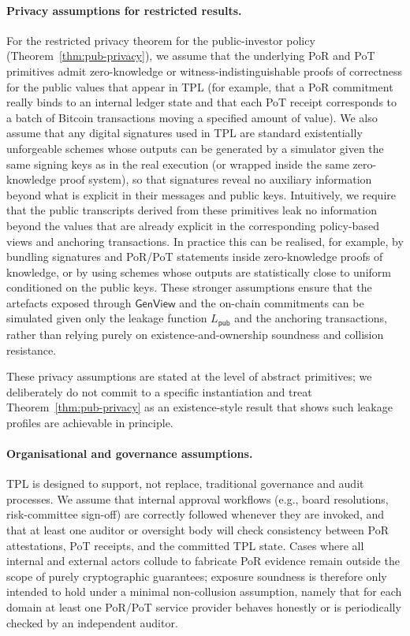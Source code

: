 \documentclass[11pt]{article}
\begin{document}
\paragraph{Privacy assumptions for restricted results.}
For the restricted privacy theorem for the public-investor policy (Theorem~\ref{thm:pub-privacy}), we assume that the underlying PoR and PoT primitives admit zero-knowledge or witness-indistinguishable proofs of correctness for the public values that appear in TPL (for example, that a PoR commitment really binds to an internal ledger state and that each PoT receipt corresponds to a batch of Bitcoin transactions moving a specified amount of value). We also assume that any digital signatures used in TPL are standard existentially unforgeable schemes whose outputs can be generated by a simulator given the same signing keys as in the real execution (or wrapped inside the same zero-knowledge proof system), so that signatures reveal no auxiliary information beyond what is explicit in their messages and public keys.
Intuitively, we require that the public transcripts derived from these primitives leak no information beyond the values that are already explicit in the corresponding policy-based views and anchoring transactions.
In practice this can be realised, for example, by bundling signatures and PoR/PoT statements inside zero-knowledge proofs of knowledge, or by using schemes whose outputs are statistically close to uniform conditioned on the public keys.
These stronger assumptions ensure that the artefacts exposed through $\mathsf{GenView}$ and the on-chain commitments can be simulated given only the leakage function $L_{\mathsf{pub}}$ and the anchoring transactions, rather than relying purely on existence-and-ownership soundness and collision resistance.

These privacy assumptions are stated at the level of abstract primitives; we deliberately do not commit to a specific instantiation and treat Theorem~\ref{thm:pub-privacy} as an existence-style result that shows such leakage profiles are achievable in principle.

\paragraph{Organisational and governance assumptions.}
TPL is designed to support, not replace, traditional governance and audit processes.
We assume that internal approval workflows (e.g., board resolutions, risk-committee sign-off) are correctly followed whenever they are invoked, and that at least one auditor or oversight body will check consistency between PoR attestations, PoT receipts, and the committed TPL state.
Cases where all internal and external actors collude to fabricate PoR evidence remain outside the scope of purely cryptographic guarantees; exposure soundness is therefore only intended to hold under a minimal non-collusion assumption, namely that for each domain at least one PoR/PoT service provider behaves honestly or is periodically checked by an independent auditor.
\end{document}
